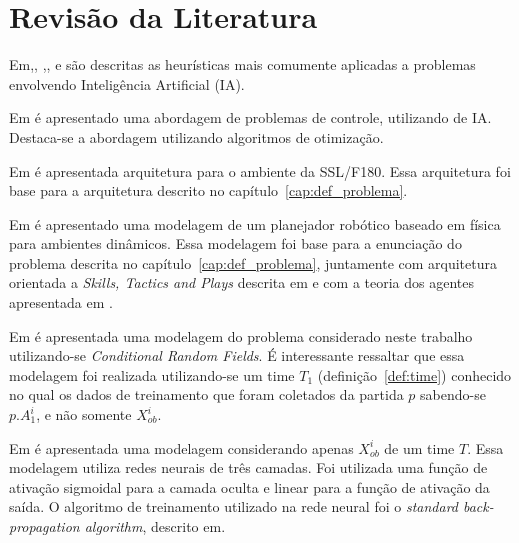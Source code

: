 

\chapter{Revisão da Literatura}\label{cap:rev_bibliografica}


Em\cite{russellnorvig},\cite{haykin2001redes},
\cite{kosko1997fuzzy},\cite{passos2005datamining},
\cite{doringo2004ant} e\cite{bertsimas1993simulated}
são descritas as heurísticas mais comumente aplicadas a problemas envolvendo
Inteligência Artificial (IA).

Em\cite{yoneyama2004ia} é apresentado uma abordagem de problemas de controle,
utilizando de IA\@. Destaca-se a abordagem utilizando algoritmos de otimização.

Em\cite{felixnavarro} é apresentada arquitetura para o ambiente da SSL/F180.
Essa arquitetura foi base para a arquitetura descrito no
capítulo~\ref{cap:def_problema}.

Em\cite{zickler} é apresentado uma modelagem de um planejador robótico baseado
em física para ambientes dinâmicos. Essa modelagem foi base para a enunciação
do problema descrita no capítulo~\ref{cap:def_problema}, juntamente com
arquitetura orientada a \textit{Skills, Tactics and Plays} descrita em
\cite{bowling2003plays} e com a teoria dos agentes apresentada em
\cite{russellnorvig}.

Em\cite{vail2008crf} é apresentada uma modelagem do problema considerado neste
trabalho utilizando-se \textit{Conditional Random Fields}. É interessante
ressaltar que essa modelagem foi realizada utilizando-se um time $T_1$
(definição~\ref{def:time}) conhecido no qual os dados de treinamento que foram
coletados da partida $p$ sabendo-se $p.A_1^{i}$, e não somente $X_{ob}^{i}$.

Em\cite{sheng2005motionprediction} é apresentada uma modelagem considerando
apenas $X_{ob}^{i}$ de um time $T$. Essa modelagem utiliza redes neurais de
três camadas. Foi utilizada uma função de ativação sigmoidal para a camada
oculta e linear para a função de ativação da saída. O algoritmo de treinamento
utilizado na rede neural foi o \textit{standard back-propagation algorithm},
descrito em\cite{haykin2001redes}.

